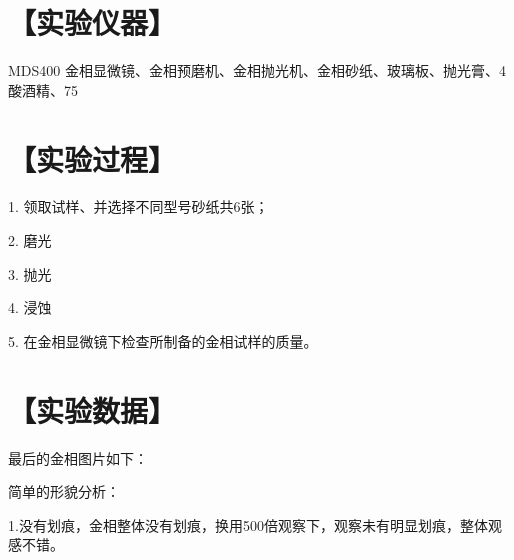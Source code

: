 \documentclass[a4paper,utf8]{article}
\begin{document}
\section*{【实验仪器】}%
MDS400 金相显微镜、金相预磨机、金相抛光机、金相砂纸、玻璃板、抛光膏、4%
酸酒精、75%
\section*{【实验过程】}%

1. 领取试样、并选择不同型号砂纸共6张；

2. 磨光

3. 抛光

4. 浸蚀

5. 在金相显微镜下检查所制备的金相试样的质量。

\newpage
\section*{【实验数据】}
最后的金相图片如下：
\begin{figure}[!ht]
    \begin{floatrow}
    \end{floatrow}

\end{figure}


简单的形貌分析：

1.没有划痕，金相整体没有划痕，换用500倍观察下，观察未有明显划痕，整体观感不错。
\end{document}
